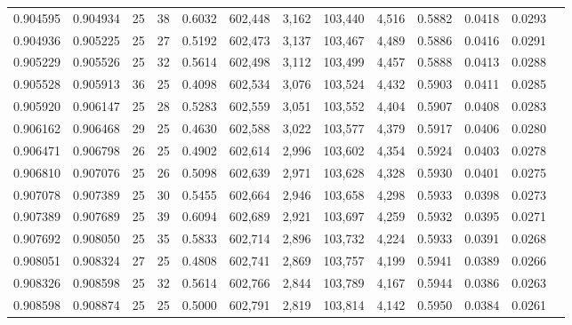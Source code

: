 \begin{tabular}{rrrrrrrrrrrrr}
0.904595 & 0.904934 &    25 &  38 &                                     0.6032 & 602,448 &   3,162 & 103,440 &   4,516 & 0.5882 & 0.0418 & 0.0293 \\
0.904936 & 0.905225 &    25 &  27 &                                     0.5192 & 602,473 &   3,137 & 103,467 &   4,489 & 0.5886 & 0.0416 & 0.0291 \\
0.905229 & 0.905526 &    25 &  32 &                                     0.5614 & 602,498 &   3,112 & 103,499 &   4,457 & 0.5888 & 0.0413 & 0.0288 \\
0.905528 & 0.905913 &    36 &  25 &                                     0.4098 & 602,534 &   3,076 & 103,524 &   4,432 & 0.5903 & 0.0411 & 0.0285 \\
0.905920 & 0.906147 &    25 &  28 &                                     0.5283 & 602,559 &   3,051 & 103,552 &   4,404 & 0.5907 & 0.0408 & 0.0283 \\
0.906162 & 0.906468 &    29 &  25 &                                     0.4630 & 602,588 &   3,022 & 103,577 &   4,379 & 0.5917 & 0.0406 & 0.0280 \\
0.906471 & 0.906798 &    26 &  25 &                                     0.4902 & 602,614 &   2,996 & 103,602 &   4,354 & 0.5924 & 0.0403 & 0.0278 \\
0.906810 & 0.907076 &    25 &  26 &                                     0.5098 & 602,639 &   2,971 & 103,628 &   4,328 & 0.5930 & 0.0401 & 0.0275 \\
0.907078 & 0.907389 &    25 &  30 &                                     0.5455 & 602,664 &   2,946 & 103,658 &   4,298 & 0.5933 & 0.0398 & 0.0273 \\
0.907389 & 0.907689 &    25 &  39 &                                     0.6094 & 602,689 &   2,921 & 103,697 &   4,259 & 0.5932 & 0.0395 & 0.0271 \\
0.907692 & 0.908050 &    25 &  35 &                                     0.5833 & 602,714 &   2,896 & 103,732 &   4,224 & 0.5933 & 0.0391 & 0.0268 \\
0.908051 & 0.908324 &    27 &  25 &                                     0.4808 & 602,741 &   2,869 & 103,757 &   4,199 & 0.5941 & 0.0389 & 0.0266 \\
0.908326 & 0.908598 &    25 &  32 &                                     0.5614 & 602,766 &   2,844 & 103,789 &   4,167 & 0.5944 & 0.0386 & 0.0263 \\
0.908598 & 0.908874 &    25 &  25 &                                     0.5000 & 602,791 &   2,819 & 103,814 &   4,142 & 0.5950 & 0.0384 & 0.0261 \\

\end{tabular}
